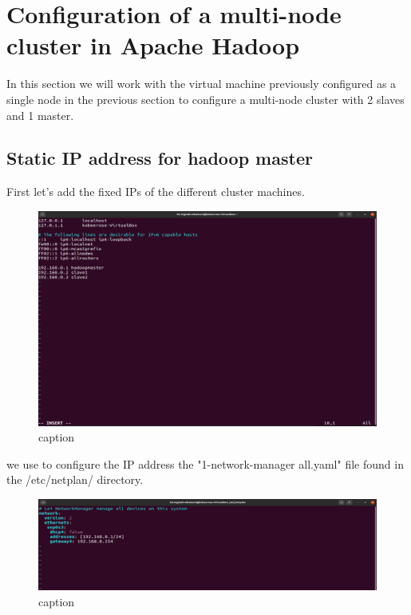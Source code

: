 \chapter{Configuration of a multi-node cluster in Apache Hadoop}
\par In this section we will work with the virtual machine previously configured as a single node in the previous section to configure a multi-node cluster with 2 slaves and 1 master.
\begin{spacing}{1.2}
\section{Static IP address for hadoop master}

\par First let's add the fixed IPs of the different cluster machines.
\\
\begin{figure}[!htb] 
\begin{center} 
\includegraphics[width=1\linewidth]{Big_Data/Hadoop/Multi-Nodes Cluster/Adding Hosts.jpg} 
\end{center} 
\caption{caption} 
\end{figure} 
\FloatBarrier



\par we use to configure the IP address the "1-network-manager all.yaml" file found in the /etc/netplan/ directory.
\\
\begin{figure}[!htb] 
\begin{center} 
\includegraphics[width=1\linewidth]{Big_Data/Hadoop/Multi-Nodes Cluster/Fixing the IP adresse.jpg} 
\end{center} 
\caption{caption} 
\end{figure} 
\FloatBarrier


\end{spacing}
